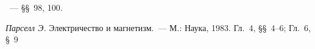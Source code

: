 \begin{lab:literature}

\item \SivuhinIII~--- \S\S~98, 100.

\item \emph{Парселл Э.} Электричество и магнетизм.~--- М.: Наука, 1983. Гл.~4,
\S\S~4--6; Гл.~6, \S~9

\end{lab:literature}
